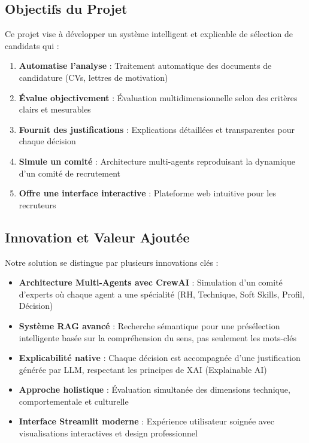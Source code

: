 \documentclass{rapportECL}
\begin{document}
\subsection{Objectifs du Projet}

Ce projet vise à développer un système intelligent et explicable de sélection de candidats qui :

\begin{enumerate}[leftmargin=*]
    \item \textbf{Automatise l'analyse} : Traitement automatique des documents de candidature (CVs, lettres de motivation)
    \item \textbf{Évalue objectivement} : Évaluation multidimensionnelle selon des critères clairs et mesurables
    \item \textbf{Fournit des justifications} : Explications détaillées et transparentes pour chaque décision
    \item \textbf{Simule un comité} : Architecture multi-agents reproduisant la dynamique d'un comité de recrutement
    \item \textbf{Offre une interface interactive} : Plateforme web intuitive pour les recruteurs
\end{enumerate}

\subsection{Innovation et Valeur Ajoutée}

Notre solution se distingue par plusieurs innovations clés :

\begin{tcolorbox}[colback=accentgreen!10,colframe=accentgreen,title=\textbf{Points d'Innovation}]
\begin{itemize}[leftmargin=*]
    \item \textbf{Architecture Multi-Agents avec CrewAI} : Simulation d'un comité d'experts où chaque agent a une spécialité (RH, Technique, Soft Skills, Profil, Décision)
    \item \textbf{Système RAG avancé} : Recherche sémantique pour une présélection intelligente basée sur la compréhension du sens, pas seulement les mots-clés
    \item \textbf{Explicabilité native} : Chaque décision est accompagnée d'une justification générée par LLM, respectant les principes de XAI (Explainable AI)
    \item \textbf{Approche holistique} : Évaluation simultanée des dimensions technique, comportementale et culturelle
    \item \textbf{Interface Streamlit moderne} : Expérience utilisateur soignée avec visualisations interactives et design professionnel
\end{itemize}
\end{tcolorbox}
\end{document}
